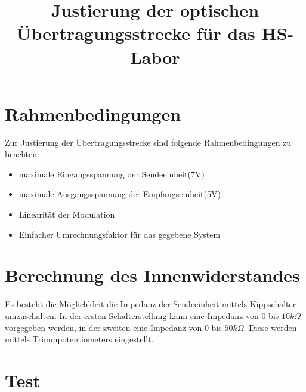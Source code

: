 \documentclass[10pt]{scrartcl}
\begin{document}
\title{Justierung der optischen Übertragungsstrecke für das HS-Labor}

\section{Rahmenbedingungen}
Zur Justierung der Übertragungsstrecke sind folgende Rahmenbedingungen zu beachten:
\begin{itemize}
\item maximale Eingangsspannung der Sendeeinheit(7V)
\item maximale Ausgangsspannung der Empfangseinheit(5V)
\item Linearität der Modulation
\item Einfacher Umrechnungsfaktor für das gegebene System
\end{itemize}

\section{Berechnung des Innenwiderstandes}
Es besteht die Möglichkleit die Impedanz der Sendeeinheit mittels Kippschalter umzuschalten. In der ersten Schalterstellung kann eine Impedanz von 0 bis $10k\Omega$ vorgegeben werden, in der zweiten eine Impedanz von 0 bis $50k\Omega$. Diese werden mittels Trimmpotentiometers eingestellt. 
\section{Test}
  	\begin{figure}[H]
		
		
		\end{figure}
		\begin{figure}[H]
	
	\end{figure}
	\begin{figure}[H]
		
		\end{figure}
		\begin{figure}[H]
	
	\end{figure}
 
\end{document}

